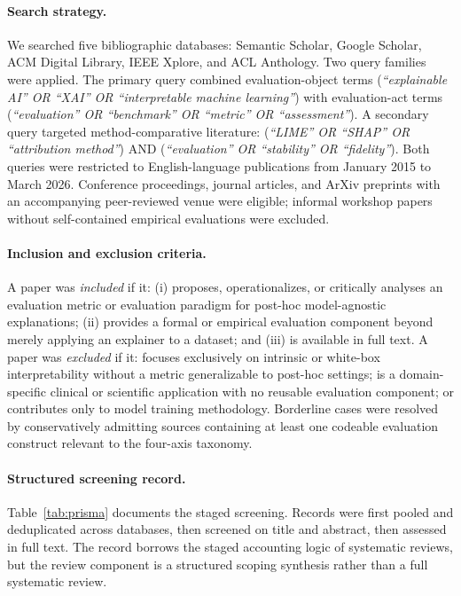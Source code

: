 \documentclass[fleqn,10pt,lineno]{wlpeerj}
\begin{document}
\paragraph{Search strategy.}
We searched five bibliographic databases: Semantic Scholar, Google
Scholar, ACM Digital Library, IEEE Xplore, and ACL Anthology. Two
query families were applied. The primary query combined evaluation-object
terms (\emph{``explainable AI'' OR ``XAI'' OR ``interpretable machine
learning''}) with evaluation-act terms (\emph{``evaluation'' OR
``benchmark'' OR ``metric'' OR ``assessment''}). A secondary query
targeted method-comparative literature: (\emph{``LIME'' OR ``SHAP'' OR
``attribution method''}) AND (\emph{``evaluation'' OR ``stability'' OR
``fidelity''}). Both queries were restricted to English-language
publications from January 2015 to March 2026. Conference proceedings,
journal articles, and ArXiv preprints with an accompanying peer-reviewed
venue were eligible; informal workshop papers without self-contained
empirical evaluations were excluded.

\paragraph{Inclusion and exclusion criteria.}
A paper was \emph{included} if it: (i) proposes, operationalizes, or
critically analyses an evaluation metric or evaluation paradigm for
post-hoc model-agnostic explanations; (ii) provides a formal or
empirical evaluation component beyond merely applying an explainer to a
dataset; and (iii) is available in full text. A paper was \emph{excluded}
if it: focuses exclusively on intrinsic or white-box interpretability
without a metric generalizable to post-hoc settings; is a
domain-specific clinical or scientific application with no reusable
evaluation component; or contributes only to model training methodology.
Borderline cases were resolved by conservatively admitting sources
containing at least one codeable evaluation construct relevant to the
four-axis taxonomy.

\paragraph{Structured screening record.}
Table~\ref{tab:prisma} documents the staged screening. Records were
first pooled and deduplicated across databases, then screened on title
and abstract, then assessed in full text. The record borrows the staged
accounting logic of systematic reviews, but the review component is a
structured scoping synthesis rather than a full systematic review.
\end{document}
